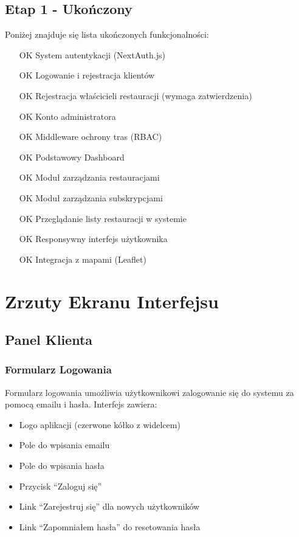 \documentclass[12pt,a4paper,utf-8]{article}
\begin{document}
\subsection{Etap 1 - Ukończony}

Poniżej znajduje się lista ukończonych funkcjonalności:

\begin{enumerate}
    \item [OK] System autentykacji (NextAuth.js)
    \item [OK] Logowanie i rejestracja klientów
    \item [OK] Rejestracja właścicieli restauracji (wymaga zatwierdzenia)
    \item [OK] Konto administratora
    \item [OK] Middleware ochrony tras (RBAC)
    \item [OK] Podstawowy Dashboard
    \item [OK] Moduł zarządzania restauracjami
    \item [OK] Moduł zarządzania subskrypcjami
    \item [OK] Przeglądanie listy restauracji w systemie
    \item [OK] Responsywny interfejs użytkownika
    \item [OK] Integracja z mapami (Leaflet)


\end{enumerate}

\newpage

\section{Zrzuty Ekranu Interfejsu}

\subsection{Panel Klienta}

\subsubsection{Formularz Logowania}

Formularz logowania umożliwia użytkownikowi zalogowanie się do systemu za pomocą emailu i hasła. Interfejs zawiera:

\begin{itemize}
    \item Logo aplikacji (czerwone kółko z widelcem)
    \item Pole do wpisania emailu
    \item Pole do wpisania hasła
    \item Przycisk ``Zaloguj się''
    \item Link ``Zarejestruj się'' dla nowych użytkowników
    \item Link ``Zapomniałem hasła'' do resetowania hasła
\end{itemize}
\end{document}
